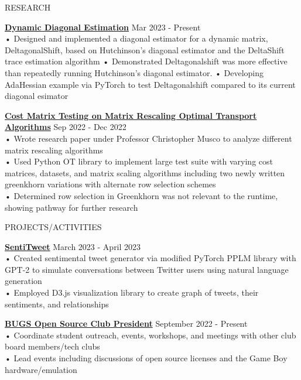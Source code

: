 \documentclass{resume} %
\begin{document}
\begin{rSection}{RESEARCH}

\textbf {\href{https://github.com/aminoa/deltagonalshift}{Dynamic Diagonal Estimation}} \hfill Mar 2023 - Present \\
• Designed and implemented a diagonal estimator for a dynamic matrix, DeltagonalShift, based on Hutchinson's diagonal estimator and the DeltaShift trace estimation algorithm \newline
• Demonstrated Deltagonalshift was more effective than repeatedly running Hutchinson's diagonal estimator. \newline
• Developing AdaHessian example via PyTorch to test Deltagonalshift compared to its current diagonal esimator

\textbf {\href{https://github.com/aminoa/gaussian_pot_tests}{Cost Matrix Testing on Matrix Rescaling Optimal Transport Algorithms}} \hfill Sep 2022 - Dec 2022 \\
• Wrote research paper under Professor Christopher Musco to analyze different matrix rescaling algorithms\\ 
• Used Python OT library to implement large test suite with varying cost matrices, datasets, and matrix scaling algorithms including two newly written greenkhorn variations with alternate row selection schemes \\ 
• Determined row selection in Greenkhorn was not relevant to the runtime, showing pathway for further research

\end{rSection}

\begin{rSection}{PROJECTS/ACTIVITIES}

\textbf {\href{https://github.com/aminoa/sentitweet/}{SentiTweet}} \hfill March 2023 - April 2023 \\
• Created sentimental tweet generator via modified PyTorch PPLM library with GPT-2 to simulate conversations between Twitter users using natural language generation\\
• Employed D3.js visualization library to create graph of tweets, their sentiments, and relationships 

\textbf{\href{https://bugs-nyu.github.io/}{BUGS Open Source Club President}} \hfill September 2022 - Present \\
• Coordinate student outreach, events, workshops, and meetings with other club board members/tech clubs \\
• Lead events including discussions of open source licenses and the Game Boy hardware/emulation \\

\end{rSection}
\end{document}
